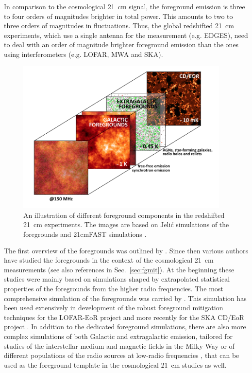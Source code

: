 In comparison to the cosmological 21~cm signal, the foreground emission is three to four orders of magnitudes brighter in total power. This amounts to two to three orders of magnitudes in fluctuations. Thus, the global redshifted 21~cm experiments, which use a single antenna for the measurement (e.g. EDGES), need to deal with an order of magnitude brighter foreground emission than the ones using interferometers (e.g. LOFAR, MWA and SKA). 

\begin{figure}[!t]
   \centering
    \includegraphics[width=0.95\textwidth]{Chapman_Jelic/Images/fgcube.png}
    \caption{An illustration of different foreground components in the redshifted 21~cm experiments. The images are based on Jeli\'c simulations of the foregrounds \cite{jelic10, jelic08} and 21cmFAST simulations \cite{mesinger11}.}
    \label{fig:fgcube}
\end{figure}

The first overview of the foregrounds was outlined by \cite{shaver99}. Since then various authors have studied the foregrounds in the context of the cosmological 21~cm measurements \cite{bowman09, cooray04, deoliveiracosta08, dimatteo04, dimatteo02, jelic08, jelic10, liu12, oh03, petrovic11, spinelli18, wang06} (see also references in Sec.~\ref{sec:fgmit}).  
At the beginning these studies were mainly based on simulations shaped by extrapolated statistical properties of the foregrounds from the higher radio frequencies. The most comprehensive 
simulation of the foregrounds was carried by \cite{jelic08}.  This simulation has been used extensively in development of the robust foreground mitigation techniques for the LOFAR-EoR project \cite{Chapman2013MNRAS.429..165C, Chapman2012MNRAS.423.2518C, ghosh18,  Harker2010MNRAS.405.2492H, Harker2009MNRAS.397.1138H, Harker2009MNRAS.393.1449H, jelic08, mertens18} and more recently for the SKA CD/EoR project \cite{Chapman2015aska.confE...5C, Chapman2016MNRAS.458.2928C}. In addition to the dedicated foreground simulations, there are also more complex simulations of both Galactic and extragalactic emission, tailored for studies of the interstellar medium and magnetic fields in the Milky Way \cite{haverkorn19, sun09, waelkens09} or of different populations of the radio sources at low-radio frequencies \cite{bonaldi19, wilman10, wilman08}, that can be used as the foreground template in the cosmological 21~cm studies as well.

